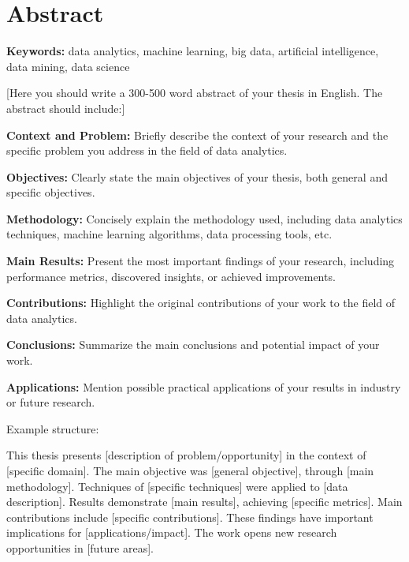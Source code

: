 
\chapter*{Abstract}

\textbf{Keywords:} data analytics, machine learning, big data, artificial intelligence, data mining, data science

\vspace{1cm}

[Here you should write a 300-500 word abstract of your thesis in English. The abstract should include:]

\textbf{Context and Problem:} Briefly describe the context of your research and the specific problem you address in the field of data analytics.

\textbf{Objectives:} Clearly state the main objectives of your thesis, both general and specific objectives.

\textbf{Methodology:} Concisely explain the methodology used, including data analytics techniques, machine learning algorithms, data processing tools, etc.

\textbf{Main Results:} Present the most important findings of your research, including performance metrics, discovered insights, or achieved improvements.

\textbf{Contributions:} Highlight the original contributions of your work to the field of data analytics.

\textbf{Conclusions:} Summarize the main conclusions and potential impact of your work.

\textbf{Applications:} Mention possible practical applications of your results in industry or future research.

Example structure:

This thesis presents [description of problem/opportunity] in the context of [specific domain]. The main objective was [general objective], through [main methodology]. Techniques of [specific techniques] were applied to [data description]. Results demonstrate [main results], achieving [specific metrics]. Main contributions include [specific contributions]. These findings have important implications for [applications/impact]. The work opens new research opportunities in [future areas].

\newpage
